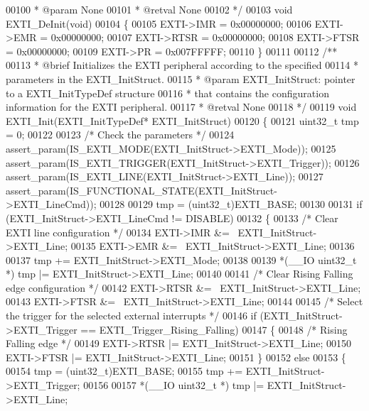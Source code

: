 \begin{DoxyCode}
00100 \textcolor{comment}{  * @param  None}
00101 \textcolor{comment}{  * @retval None}
00102 \textcolor{comment}{  */}
00103 \textcolor{keywordtype}{void} EXTI_DeInit(\textcolor{keywordtype}{void})
00104 \{
00105   EXTI->IMR = 0x00000000;
00106   EXTI->EMR = 0x00000000;
00107   EXTI->RTSR = 0x00000000;
00108   EXTI->FTSR = 0x00000000;
00109   EXTI->PR = 0x007FFFFF;
00110 \}
00111 
00112 \textcolor{comment}{/**}
00113 \textcolor{comment}{  * @brief  Initializes the EXTI peripheral according to the specified}
00114 \textcolor{comment}{  *         parameters in the EXTI\_InitStruct.}
00115 \textcolor{comment}{  * @param  EXTI\_InitStruct: pointer to a EXTI\_InitTypeDef structure}
00116 \textcolor{comment}{  *         that contains the configuration information for the EXTI peripheral.}
00117 \textcolor{comment}{  * @retval None}
00118 \textcolor{comment}{  */}
00119 \textcolor{keywordtype}{void} EXTI_Init(EXTI\_InitTypeDef* EXTI\_InitStruct)
00120 \{
00121   uint32\_t tmp = 0;
00122 
00123   \textcolor{comment}{/* Check the parameters */}
00124   assert_param(IS\_EXTI\_MODE(EXTI\_InitStruct->EXTI\_Mode));
00125   assert_param(IS\_EXTI\_TRIGGER(EXTI\_InitStruct->EXTI\_Trigger));
00126   assert_param(IS\_EXTI\_LINE(EXTI\_InitStruct->EXTI\_Line));
00127   assert_param(IS\_FUNCTIONAL\_STATE(EXTI\_InitStruct->EXTI\_LineCmd));
00128 
00129   tmp = (uint32\_t)EXTI_BASE;
00130 
00131   \textcolor{keywordflow}{if} (EXTI\_InitStruct->EXTI_LineCmd != DISABLE)
00132   \{
00133     \textcolor{comment}{/* Clear EXTI line configuration */}
00134     EXTI->IMR &= ~EXTI\_InitStruct->EXTI\_Line;
00135     EXTI->EMR &= ~EXTI\_InitStruct->EXTI\_Line;
00136 
00137     tmp += EXTI\_InitStruct->EXTI_Mode;
00138 
00139     *(\_\_IO uint32\_t *) tmp |= EXTI\_InitStruct->EXTI\_Line;
00140 
00141     \textcolor{comment}{/* Clear Rising Falling edge configuration */}
00142     EXTI->RTSR &= ~EXTI\_InitStruct->EXTI\_Line;
00143     EXTI->FTSR &= ~EXTI\_InitStruct->EXTI\_Line;
00144 
00145     \textcolor{comment}{/* Select the trigger for the selected external interrupts */}
00146     \textcolor{keywordflow}{if} (EXTI\_InitStruct->EXTI_Trigger == EXTI_Trigger_Rising_Falling)
00147     \{
00148       \textcolor{comment}{/* Rising Falling edge */}
00149       EXTI->RTSR |= EXTI\_InitStruct->EXTI\_Line;
00150       EXTI->FTSR |= EXTI\_InitStruct->EXTI\_Line;
00151     \}
00152     \textcolor{keywordflow}{else}
00153     \{
00154       tmp = (uint32\_t)EXTI_BASE;
00155       tmp += EXTI\_InitStruct->EXTI_Trigger;
00156 
00157       *(\_\_IO uint32\_t *) tmp |= EXTI\_InitStruct->EXTI\_Line;

\end{DoxyCode}

